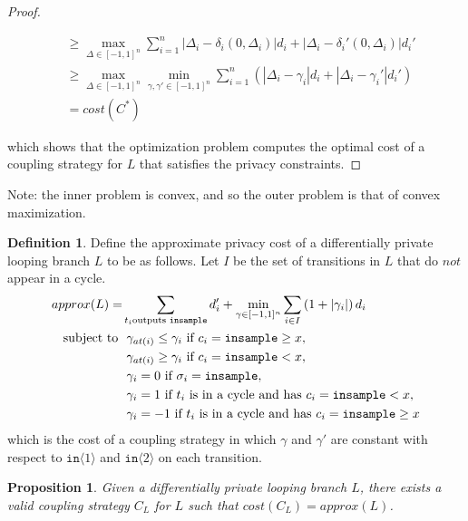 \documentclass[12pt]{article}
\newcommand{\gguard}[1][x]{\texttt{insample}\geq #1}
\newcommand{\lguard}[1][x]{\texttt{insample} < #1}
\newcommand{\brangle}[1]{\langle #1 \rangle}
\newtheorem{prop}[thm]{Proposition}
\theoremstyle{definition}
\newtheorem{defn}[thm]{Definition}
\begin{document}
\begin{proof}
\begin{enumerate}
\begin{align*}
            &\geq \max_{\Delta \in [-1, 1]^n} \sum_{i = 1}^n  |\Delta_i - \delta_i(0, \Delta_i)| d_i + |\Delta_i - \delta_i'(0, \Delta_i)|d_i' \\
            &\geq \max_{\Delta \in [-1, 1]^n} \min_{\gamma, \gamma' \in [-1, 1]^n} \sum_{i = 1}^n \left(|\Delta_i - \gamma_i| d_i + |\Delta_i - \gamma_i'|d_i' \right)\\
            &= cost(C^*)
        \end{align*}
    \end{enumerate}
    which shows that the optimization problem computes the optimal cost of a coupling strategy for $L$ that satisfies the privacy constraints.
\end{proof}

Note: the inner problem is convex, and so the outer problem is that of convex maximization. 

\begin{defn}
    Define the approximate privacy cost of a differentially private looping branch $L$ to be as follows. Let $I$ be the set of transitions in $L$ that do $\textit{not}$ appear in a cycle.  
    \begin{align*} 
        approx(L) = &\sum_{t_i \text{outputs \texttt{insample}}} d_i' + \min_{\gamma \in [-1, 1]^n} \sum_{i \in I} \left(1 + |\gamma_i| \right) d_i  \\
            \text{subject to } 
            &\ \gamma_{at(i)} \leq \gamma_i \text{ if } c_i = \gguard, \\
            &\ \gamma_{at(i)} \geq \gamma_i \text{ if } c_i = \lguard, \\
            &\ \gamma_i = 0 \text{ if } \sigma_i = \texttt{insample}, \\
            &\ \gamma_i = 1 \text{ if } t_i \text{ is in a cycle and has } c_i = \lguard,\\ 
            &\ \gamma_i = -1 \text{ if } t_i \text{ is in a cycle and has } c_i = \gguard
    \end{align*}
    which is the cost of a coupling strategy in which $\gamma$ and $\gamma'$ are constant with respect to $\texttt{in}\brangle{1}$ and $\texttt{in}\brangle{2}$ on each transition. 
\end{defn}

\begin{prop}
    Given a differentially private looping branch $L$, there exists a valid coupling strategy $C_L$ for $L$ such that $cost(C_L) = approx(L)$.
\end{prop}
\end{document}

